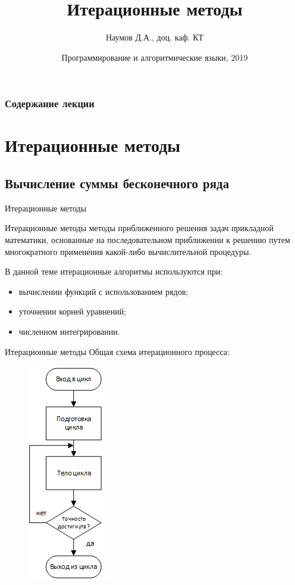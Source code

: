\documentclass{beamer}
\title[Итерционные методы]{Итерационные методы}
\author{Наумов Д.А., доц. каф. КТ}
\date[31.10.2019] {Программирование и алгоритмические языки, 2019}
\begin{document}
\begin{frame}
  \titlepage
\end{frame}
  
\begin{frame}
  \frametitle{Содержание лекции}
  \tableofcontents  
\end{frame}

\section{Итерационные методы}

\subsection{Вычисление суммы бесконечного ряда}

\begin{frame}{Итерационные методы}
\begin{block}{Итерационные методы}
методы приближенного решения задач прикладной математики, основанные на последовательном приближении к решению путем многократного применения какой-либо вычислительной процедуры.
\end{block}
В данной теме итерационные алгоритмы используются при:
\begin{itemize}
\item вычислении функций с использованием рядов;
\item уточнении корней уравнений;
\item численном интегрировании.
\end{itemize}
\end{frame} 

\begin{frame}{Итерационные методы}
Общая схема итерационного процесса:
\begin{figure}[h]
\centering
\includegraphics[scale=0.75]{images/lec05-pic01.png}
\end{figure}
\end{frame} 
\end{document}
